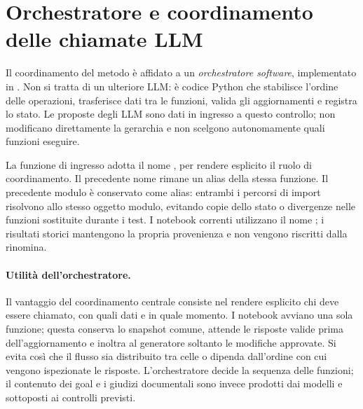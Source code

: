 \section{Orchestratore e coordinamento delle chiamate LLM}
\label{sec:goal-orchestrator}
Il coordinamento del metodo è affidato a un \emph{orchestratore software},
implementato in . Non si tratta di un
ulteriore LLM: è codice Python che stabilisce l'ordine delle operazioni,
trasferisce dati tra le funzioni, valida gli aggiornamenti e registra lo stato.
Le proposte degli LLM sono dati in ingresso a questo controllo; non modificano
direttamente la gerarchia e non scelgono autonomamente quali funzioni eseguire.

La funzione di ingresso adotta il nome ,
per rendere esplicito il ruolo di coordinamento. Il precedente nome
 rimane un alias della stessa funzione.
Il precedente modulo
 è conservato come alias: entrambi i percorsi di import
risolvono allo stesso oggetto modulo, evitando copie dello stato o divergenze
nelle funzioni sostituite durante i test. I notebook correnti utilizzano il
nome ; i risultati storici mantengono la propria
provenienza e non vengono riscritti dalla rinomina.

\paragraph{Utilit\`a dell'orchestratore.}
Il vantaggio del coordinamento centrale consiste nel rendere esplicito chi
deve essere chiamato, con quali dati e in quale momento. I notebook avviano
una sola funzione; questa conserva lo snapshot comune, attende le risposte
valide prima dell'aggiornamento e inoltra al generatore soltanto le modifiche
approvate. Si evita cos\`i che il flusso sia distribuito tra celle o dipenda
dall'ordine con cui vengono ispezionate le risposte. L'orchestratore decide
la sequenza delle funzioni; il contenuto dei goal e i giudizi documentali
sono invece prodotti dai modelli e sottoposti ai controlli previsti.

